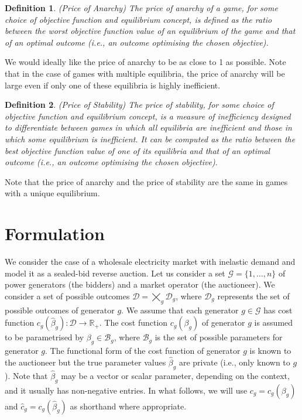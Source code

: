 \documentclass{article}
\newtheorem{definition}{Definition}
\begin{document}
\begin{definition}
(Price of Anarchy) The price of anarchy of a game, for some choice of objective function and equilibrium concept, is defined as the ratio between the worst objective function value of an equilibrium of the game and that of an optimal outcome (i.e., an outcome optimising the chosen objective).
\end{definition}

We would ideally like the price of anarchy to be as close to 1 as possible. Note that in the case of games with multiple equilibria, the price of anarchy will be large even if only one of these equilibria is highly inefficient. 

\begin{definition}
(Price of Stability) The price of stability, for some choice of objective function and equilibrium concept, is a measure of inefficiency designed to differentiate between games in which all equilibria are inefficient and those in which some equilibrium is inefficient. It can be computed as the ratio between the best objective function value of one of its equilibria and that of an optimal outcome (i.e., an outcome optimising the chosen objective).
\end{definition}

Note that the price of anarchy and the price of stability are the same in games with a unique equilibrium.

\section{Formulation}

We consider the case of a wholesale electricity market with inelastic demand and model it as a sealed-bid reverse auction. Let us consider a set $\mathcal{G} = \{1, \ldots, n\}$ of power generators (the bidders) and a market operator (the auctioneer). We consider a set of possible outcomes $\mathcal{D} = \bigtimes_g \mathcal{D}_g$, where $\mathcal{D}_g$ represents the set of possible outcomes of generator $g$. We assume that each generator $g \in \mathcal{G}$ has cost function $c_g(\hat{\beta}_g): \mathcal{D} \rightarrow \mathbb{R}_+$. The cost function $c_g(\beta_g)$ of generator $g$ is assumed to be parametrised by $\beta_g \in \mathcal{B}_g$, where $\mathcal{B}_g$ is the set of possible parameters for generator $g$. The functional form of the cost function of generator $g$ is known to the auctioneer but the true parameter values $\hat{\beta}_g$ are private (i.e., only known to $g$). Note that $\hat{\beta}_g$ may be a vector or scalar parameter, depending on the context, and it usually has non-negative entries. In what follows, we will use $c_g = c_g(\beta_g)$ and $\hat{c}_g = c_g(\hat{\beta}_g)$ as shorthand where appropriate.
\end{document}
